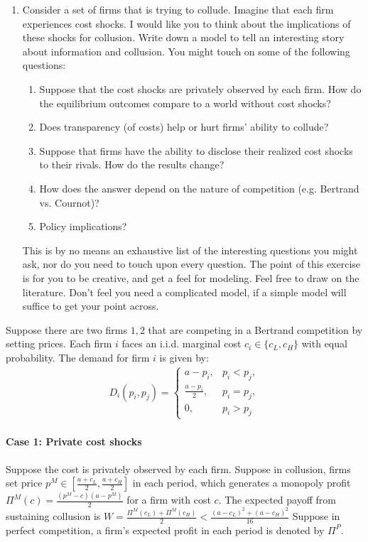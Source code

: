 \documentclass[12pt]{article}
\begin{document}
\begin{enumerate}
\item Consider a set of firms that is trying to collude. Imagine that each firm experiences cost shocks. I would like you to think about the implications of these shocks for collusion. Write down a model to tell an interesting story about information and collusion. You might touch on some of the following questions:
    \begin{enumerate}
        \item Suppose that the cost shocks are privately observed by each firm. How do the equilibrium outcomes compare to a world without cost shocks?
        \item Does transparency (of costs) help or hurt firms' ability to collude?
        \item Suppose that firms have the ability to disclose their realized cost shocks to their rivals. How do the results change?
        \item How does the answer depend on the nature of competition (e.g. Bertrand vs. Cournot)?
        \item Policy implications?
    \end{enumerate}
    This is by no means an exhaustive list of the interesting questions you might ask, nor do you need to touch upon every question. The point of this exercise is for you to be creative, and get a feel for modeling. Feel free to draw on the literature. Don't feel you need a complicated model, if a simple model will suffice to get your point across.
\end{enumerate}

Suppose there are two firms $1,2$ that are competing in a Bertrand competition by setting prices. Each firm $i$ faces an i.i.d. marginal cost $c_i\in \{c_L,c_H\}$ with equal probability. The demand for firm $i$ is given by:
\begin{equation}
    \begin{aligned}
        D_i(p_i,p_j)=\left\{\begin{matrix}
            a-p_i,& p_i<p_j,\\
            \frac{a-p_i}{2},& p_i=p_j,\\
            0,& p_i>p_j
        \end{matrix}\right.
    \end{aligned}
    \nonumber
\end{equation}

\paragraph{Case 1: Private cost shocks}
Suppose the cost is privately observed by each firm. Suppose in collusion, firms set price $p^M\in\left[\frac{a+c_L}{2},\frac{a+c_H}{2}\right]$ in each period, which generates a monopoly profit $\Pi^M(c)=\frac{(p^M-c)(a-p^M)}{2}$ for a firm with cost $c$. The expected payoff from sustaining collusion is $W=\frac{\Pi^M(c_L)+\Pi^M(c_H)}{2}<\frac{(a-c_L)^2+(a-c_H)^2}{16}$  Suppose in perfect competition, a firm's expected profit in each period is denoted by $\Pi^P$.
\end{document}
